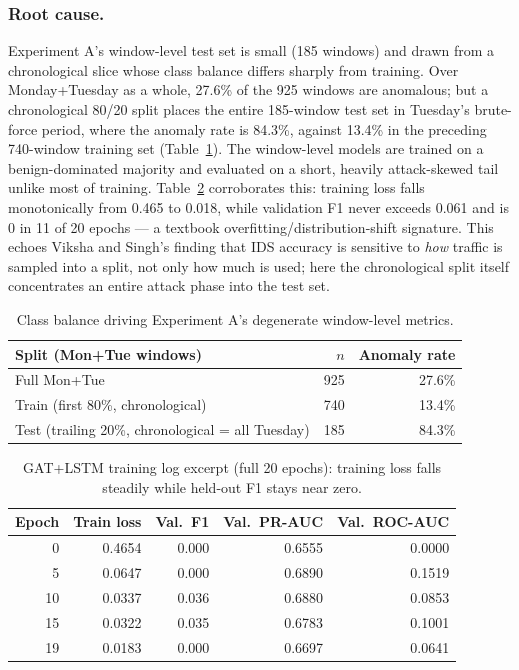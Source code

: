 \documentclass[twocolumn]{llncs}
\begin{document}
\subsubsection{Root cause.} Experiment A's window-level test set is small (185 windows) and drawn from
a chronological slice whose class balance differs sharply from training. Over Monday+Tuesday as a
whole, 27.6\% of the 925 windows are anomalous; but a chronological 80/20 split places the entire
185-window test set in Tuesday's brute-force period, where the anomaly rate is 84.3\%, against
13.4\% in the preceding 740-window training set (Table~\ref{tab:expa-imbalance}). The window-level
models are trained on a benign-dominated majority and evaluated on a short, heavily attack-skewed
tail unlike most of training. Table~\ref{tab:trainlog} corroborates this: training loss falls
monotonically from 0.465 to 0.018, while validation F1 never exceeds 0.061 and is 0 in 11 of 20
epochs --- a textbook overfitting/distribution-shift signature. This echoes Viksha and Singh's
\cite{viksha2024sampling} finding that IDS accuracy is sensitive to \emph{how} traffic is sampled
into a split, not only how much is used; here the chronological split itself concentrates an
entire attack phase into the test set.

\begin{table}[t]
\centering
\caption{Class balance driving Experiment A's degenerate window-level metrics.}
\label{tab:expa-imbalance}
\small
\begin{tabular}{|p{4.4cm}|r|r|}
\hline
Split (Mon+Tue windows) & $n$ & Anomaly rate \\
\hline
Full Mon+Tue           & 925 & 27.6\% \\
Train (first 80\%, chronological)  & 740 & 13.4\% \\
Test (trailing 20\%, chronological = all Tuesday) & 185 & 84.3\% \\
\hline
\end{tabular}
\end{table}

\begin{table}[t]
\centering
\caption{GAT+LSTM training log excerpt (full 20 epochs): training loss falls steadily while
held-out F1 stays near zero.}
\label{tab:trainlog}
\small
\begin{tabular}{|r|r|r|r|r|}
\hline
Epoch & Train loss & Val.\ F1 & Val.\ PR-AUC & Val.\ ROC-AUC \\
\hline
0  & 0.4654 & 0.000 & 0.6555 & 0.0000 \\
5  & 0.0647 & 0.000 & 0.6890 & 0.1519 \\
10 & 0.0337 & 0.036 & 0.6880 & 0.0853 \\
15 & 0.0322 & 0.035 & 0.6783 & 0.1001 \\
19 & 0.0183 & 0.000 & 0.6697 & 0.0641 \\
\hline
\end{tabular}
\end{table}
\end{document}

